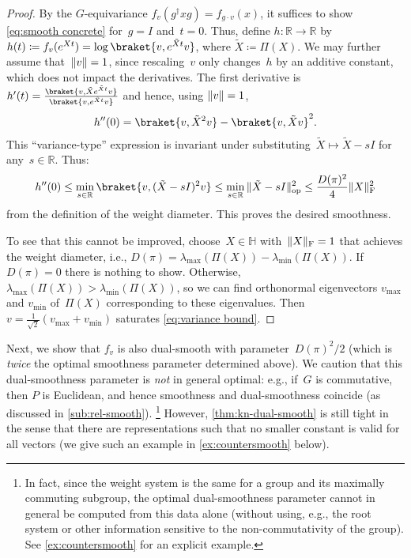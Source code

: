 \documentclass[11pt,letterpaper]{article}
\numberwithin{equation}{section}
\newcommand{\RR}{\mathbb{R}}
\newcommand{\bbH}{\mathbb{H}}
\DeclareMathOperator{\ope}{op}
\DeclarePairedDelimiter\norm{\lVert}{\rVert}
\begin{document}
\begin{proof}
By the $G$-equivariance $f_v(g^\dagger xg) = f_{g\cdot v}(x)$, it suffices to show \cref{eq:smooth concrete} for~$g = I$ and~$t=0$.
Thus, define $h \colon \RR \to \RR$ by $h(t) \coloneqq f_v(e^{Xt}) = \log \braket{v, e^{\tilde Xt} v}$, where $\tilde X \coloneqq \Pi(X)$.
We may further assume that~$\norm v=1$, since rescaling~$v$ only changes~$h$ by an additive constant, which does not impact the derivatives.
The first derivative is $h'(t) = \frac {\braket{v, \tilde X e^{\tilde Xt} v}} {\braket{v, e^{\tilde Xt} v}}$ and hence, using $\norm v=1$,
\begin{align*}
    h''(0) = \braket{v, \tilde X^2 v} - \braket{v, \tilde X v}^2.
\end{align*}
This ``variance-type'' expression is invariant under substituting~$\tilde X \mapsto \tilde X - sI$ for any~$s\in\RR$.
Thus:
\begin{align}\label{eq:variance bound}
    h''(0)
\leq \min_{s \in \RR} \braket{v, (\tilde X - s I)^2 v}
\leq \min_{s \in \RR} \, \norm{\tilde X - s I}^2_{\ope}
\leq \frac {D(\pi)^2} 4 \norm{X}_{\mathrm F}^2
\end{align}
from the definition of the weight diameter.
This proves the desired smoothness.

To see that this cannot be improved, choose~$X \in \bbH$ with~$\norm X_{\mathrm F}=1$ that achieves the weight diameter, i.e., $D(\pi) = \lambda_{\max}(\Pi(X)) - \lambda_{\min}(\Pi(X))$.
If $D(\pi)=0$ there is nothing to show.
Otherwise, $\lambda_{\max}(\Pi(X)) > \lambda_{\min}(\Pi(X))$, so we can find orthonormal eigenvectors $v_{\max}$ and $v_{\min}$ of~$\Pi(X)$ corresponding to these eigenvalues.
Then $v = \frac1{\sqrt2} (v_{\max} + v_{\min})$ saturates \cref{eq:variance bound}.
\end{proof}

Next, we show that $f_v$ is also dual-smooth with parameter~$D(\pi)^2/2$ (which is \emph{twice} the optimal smoothness parameter determined above).
We caution that this dual-smoothness parameter is \emph{not} in general optimal: e.g., if~$G$ is commutative, then $P$ is Euclidean, and hence smoothness and dual-smoothness coincide (as discussed in \cref{sub:rel-smooth}).%
\footnote{In fact, since the weight system is the same for a group and its maximally commuting subgroup, the optimal dual-smoothness parameter cannot in general be computed from this data alone (without using, e.g., the root system or other information sensitive to the non-commutativity of the group). See \cref{ex:countersmooth} for an explicit example.}
However, \cref{thm:kn-dual-smooth} is still tight in the sense that there are representations such that no smaller constant is valid for all vectors (we give such an example in \cref{ex:countersmooth} below).
\end{document}
